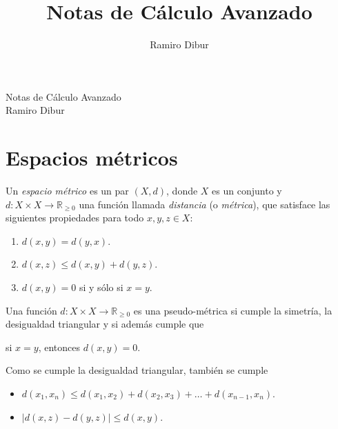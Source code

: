 \documentclass[11pt]{article}
\title{\Huge  \color{HTML}{5A0000} Notas de Cálculo Avanzado}
\author{Ramiro Dibur}
\date{}
\begin{document}
\vspace*{\fill}
\begin{center}
    {\Huge  Notas de Cálculo Avanzado} \\[1em]
    {\large Ramiro Dibur}
\end{center}
\vspace*{\fill}
\newpage
{}
\newpage
\tableofcontents
\newpage


% 

\section{Espacios métricos}

\begin{definition}
    Un \emph{espacio métrico} es un par $(X, d)$, donde $X$ es un conjunto y $d: X \times X \to \mathbb{R}_{\geq 0}$ una función llamada \emph{distancia} (o \emph{métrica}), que satisface las siguientes propiedades para todo $x, y, z \in X$:
    \begin{enumerate}
        \item $d(x, y) = d(y, x)$.
        \item $d(x, z) \le d(x, y) + d(y, z)$.
        \item $d(x, y) = 0$ si y sólo si $x = y$.
    \end{enumerate}
\end{definition}

Una función $d: X \times X \to \mathbb{R}_{\geq 0}$ es una pseudo-métrica si cumple la simetría, la desigualdad triangular y si además cumple que
\begin{center}
    si $x = y$, entonces $d(x, y) = 0$.
\end{center}

\begin{remark}
    Como se cumple la desigualdad triangular, también se cumple
    \begin{itemize}
        \item $d(x_{1}, x_{n}) \leq d(x_{1}, x_{2}) + d(x_{2}, x_{3}) + \dots + d(x_{n-1}, x_{n})$.
        \item $\lvert d(x, z) - d(y, z) \rvert \leq d(x, y)$.
    \end{itemize}
\end{remark}
\end{document}
